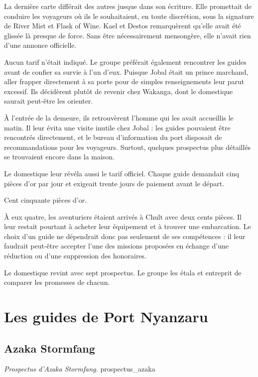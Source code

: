La dernière carte différait des autres jusque dans son écriture. Elle promettait de conduire les voyageurs où ils le souhaitaient, en toute discrétion, sous la signature de River Mist et Flask of Wine. Kael et Destos remarquèrent qu'elle avait été glissée là presque de force. Sans être nécessairement mensongère, elle n'avait rien d'une annonce officielle.

Aucun tarif n'était indiqué. Le groupe préférait également rencontrer les guides avant de confier sa survie à l'un d'eux. Puisque Jobal était un prince marchand, aller frapper directement à sa porte pour de simples renseignements leur parut excessif. Ils décidèrent plutôt de revenir chez Wakanga, dont le domestique saurait peut-être les orienter.

À l'entrée de la demeure, ils retrouvèrent l'homme qui les avait accueillis le matin. Il leur évita une visite inutile chez Jobal : les guides pouvaient être rencontrés directement, et le bureau d'information du port disposait de recommandations pour les voyageurs. Surtout, quelques prospectus plus détaillés se trouvaient encore dans la maison.

Le domestique leur révéla aussi le tarif officiel. Chaque guide demandait cinq pièces d'or par jour et exigeait trente jours de paiement avant le départ.

Cent cinquante pièces d'or.

À eux quatre, les aventuriers étaient arrivés à Chult avec deux cents pièces. Il leur restait pourtant à acheter leur équipement et à trouver une embarcation. Le choix d'un guide ne dépendrait donc pas seulement de ses compétences : il leur faudrait peut-être accepter l'une des missions proposées en échange d'une réduction ou d'une suppression des honoraires.

Le domestique revint avec sept prospectus. Le groupe les étala et entreprit de comparer les promesses de chacun.

\section*{Les guides de Port Nyanzaru}

\subsection*{Azaka Stormfang}

{\textit{Prospectus d'Azaka Stormfang.}}
{prospectus_azaka}

